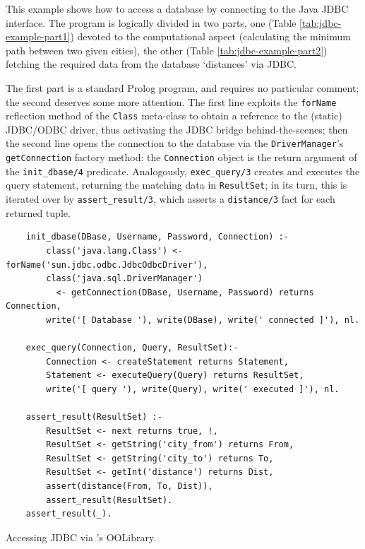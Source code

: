 This example shows how to access a database by connecting \tuprolog{} to the Java JDBC interface.
%
The program is logically divided in two parts, one (Table \ref{tab:jdbc-example-part1}) devoted to the computational aspect (calculating the minimum path between two given cities), the other (Table \ref{tab:jdbc-example-part2}) fetching the required data from the database `distances' via JDBC.

The first part is a standard Prolog program, and requires no particular comment; the second deserves some more attention. The first line exploits the \texttt{forName} reflection method of the \texttt{Class} meta-class to obtain a reference to the (static) JDBC/ODBC driver, thus activating the JDBC bridge behind-the-scenes; then the second line opens the connection to the database via the \texttt{DriverManager}'s \texttt{getConnection} factory method: the \texttt{Connection} object is the return argument of the \texttt{init\_dbase/4} predicate.
Analogously, \texttt{exec\_query/3} creates and executes the query statement, returning the matching data in \texttt{ResultSet}; in its turn, this is iterated over by \texttt{assert\_result/3}, which asserts a \texttt{distance/3} fact for each returned tuple.

\begin{table}
\small
\begin{verbatim}
    init_dbase(DBase, Username, Password, Connection) :-
        class('java.lang.Class') <- forName('sun.jdbc.odbc.JdbcOdbcDriver'),
        class('java.sql.DriverManager')
          <- getConnection(DBase, Username, Password) returns Connection,
        write('[ Database '), write(DBase), write(' connected ]'), nl.

    exec_query(Connection, Query, ResultSet):-
        Connection <- createStatement returns Statement,
        Statement <- executeQuery(Query) returns ResultSet,
        write('[ query '), write(Query), write(' executed ]'), nl.

    assert_result(ResultSet) :-
        ResultSet <- next returns true, !,
        ResultSet <- getString('city_from') returns From,
        ResultSet <- getString('city_to') returns To,
        ResultSet <- getInt('distance') returns Dist,
        assert(distance(From, To, Dist)),
        assert_result(ResultSet).
    assert_result(_).
\end{verbatim}
\caption{Accessing JDBC via \tuprolog{}'s OOLibrary.}
\label{tab:jdbc-example-part2}
\end{table}

